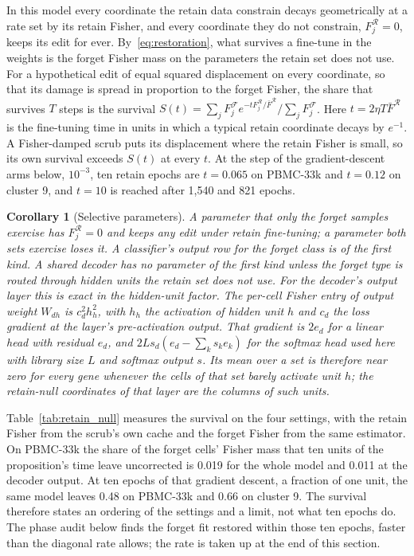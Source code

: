 \documentclass{article}
\newtheorem{corollary}{Corollary}
\begin{document}
In this model every coordinate the retain data constrain decays geometrically at a rate set by its retain Fisher, and every coordinate they do not constrain, $F^{\mathcal{R}}_j = 0$, keeps its edit for ever. By~\eqref{eq:restoration}, what survives a fine-tune in the weights is the forget Fisher mass on the parameters the retain set does not use. For a hypothetical edit of equal squared displacement on every coordinate, so that its damage is spread in proportion to the forget Fisher, the share that survives $T$ steps is the survival $S(t) = \sum_j F^{\mathcal{F}}_j e^{-t F^{\mathcal{R}}_j / \bar F^{\mathcal{R}}} / \sum_j F^{\mathcal{F}}_j$. Here $t = 2\eta T \bar F^{\mathcal{R}}$ is the fine-tuning time in units in which a typical retain coordinate decays by $e^{-1}$. A Fisher-damped scrub puts its displacement where the retain Fisher is small, so its own survival exceeds $S(t)$ at every $t$. At the step of the gradient-descent arms below, $10^{-3}$, ten retain epochs are $t = 0.065$ on PBMC-33k and $t = 0.12$ on cluster 9, and $t = 10$ is reached after 1,540 and 821 epochs.
\begin{corollary}[Selective parameters]
\label{cor:classifier}
A parameter that only the forget samples exercise has $F^{\mathcal{R}}_j = 0$ and keeps any edit under retain fine-tuning; a parameter both sets exercise loses it. A classifier's output row for the forget class is of the first kind. A shared decoder has no parameter of the first kind unless the forget type is routed through hidden units the retain set does not use. For the decoder's output layer this is exact in the hidden-unit factor. The per-cell Fisher entry of output weight $W_{dh}$ is $c_d^2 h_h^2$, with $h_h$ the activation of hidden unit $h$ and $c_d$ the loss gradient at the layer's pre-activation output. That gradient is $2 e_d$ for a linear head with residual $e_d$, and $2 L s_d (e_d - \sum_k s_k e_k)$ for the softmax head used here with library size $L$ and softmax output $s$. Its mean over a set is therefore near zero for every gene whenever the cells of that set barely activate unit $h$; the retain-null coordinates of that layer are the columns of such units.
\end{corollary}

Table~\ref{tab:retain_null} measures the survival on the four settings, with the retain Fisher from the scrub's own cache and the forget Fisher from the same estimator. On PBMC-33k the share of the forget cells' Fisher mass that ten units of the proposition's time leave uncorrected is 0.019 for the whole model and 0.011 at the decoder output. At ten epochs of that gradient descent, a fraction of one unit, the same model leaves 0.48 on PBMC-33k and 0.66 on cluster 9. The survival therefore states an ordering of the settings and a limit, not what ten epochs do. The phase audit below finds the forget fit restored within those ten epochs, faster than the diagonal rate allows; the rate is taken up at the end of this section.
\end{document}
